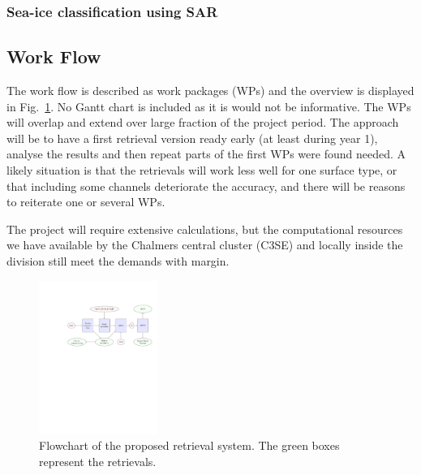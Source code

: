 \documentclass[12pt,oneside,a4paper]{article}
\begin{document}
\subsubsection{Sea-ice classification using SAR}



\subsection{Work Flow}
\label{sec:wp}


The work flow is described as work packages (WPs) and the overview is displayed
in Fig.~\ref{fig:flowchart}. No Gantt chart is included as it is would not be
informative. The WPs will overlap and extend over large fraction of the project
period. The approach will be to have a first retrieval version ready early (at
least during year 1), analyse the results and then repeat parts of the first
WPs were found needed. A likely situation is that the retrievals will work less
well for one surface type, or that including some channels deteriorate the
accuracy, and there will be reasons to reiterate one or several WPs.

The project will require extensive calculations, but
the computational resources we have available by the Chalmers central cluster
(C3SE) and locally inside the division still meet the demands with margin.

\begin{figure}
	\begin{minipage}[c]{0.70\textwidth}
		\includegraphics[trim=140 450 25 125,clip,height = 50mm]{flowchart.pdf}
	\end{minipage}\hfill
	\begin{minipage}[c]{0.28\textwidth}
		\caption{Flowchart of the proposed retrieval system. The green boxes
          represent the retrievals. 
		} \label{fig:flowchart}
	\end{minipage}
\end{figure}

\vspace{-1ex}
\end{document}
